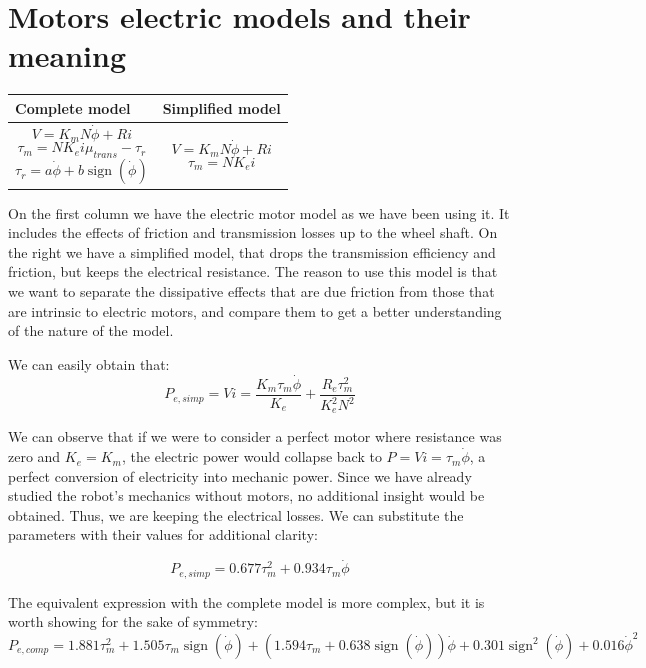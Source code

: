 \documentclass[12pt]{article}
\begin{document}
\section{Motors electric models and their meaning}

\begin{center}
	\begin{tabular}{ | m{12em} | m{10em}| } 
		\hline
		Complete model & Simplified model \\ 
		\hline
		$$ V = K_m N\dot{\phi} + Ri$$
		$$ \tau_m = N K_ei\mu_{trans} - \tau_r$$
		$$ \tau_r = a \dot{\phi} + b \operatorname{sign}(\dot{\phi}) $$ &
		$$ V = K_m N\dot{\phi} + Ri$$
		$$ \tau_m = N K_ei$$ \\ 
		\hline
	\end{tabular}
\end{center}
On the first column we have the electric motor model as we have been using it. It includes the effects of friction and transmission losses up to the wheel shaft. On the right we have a simplified model, that drops the transmission efficiency and friction, but keeps the electrical resistance. The reason to use this model is that we want to separate the dissipative effects that are due friction from those that are intrinsic to electric motors, and compare them to get a better understanding of the nature of the model.

We can easily obtain that:
$$P_{e, simp} = Vi = \frac{K_{m} \tau_{m} \dot{\phi}}{K_{e}} + \frac{R_{e} \tau_{m}^{2}}{K_{e}^{2} N^{2}}$$

We can observe that if we were to consider a perfect motor where resistance was zero and $K_e = K_m$, the electric power would collapse back to $P = Vi = \tau_{m} \dot{\phi}$, a perfect conversion of electricity into mechanic power. Since we have already studied the robot's mechanics without motors, no additional insight would be obtained. Thus, we are keeping the electrical losses. We can substitute the parameters with their values for additional clarity:

$$ P_{e, simp} = 0.677 \tau_{m}^{2} + 0.934 \tau_{m} \dot{\phi}$$

The equivalent expression with the complete model is more complex, but it is worth showing for the sake of symmetry:
$$ P_{e,comp} = 1.881 \tau_{m}^{2} + 1.505 \tau_{m} \operatorname{sign}\left(\dot{\phi}\right) + \left(1.594 \tau_{m} + 0.638 \operatorname{sign}\left(\dot{\phi}\right)\right) \dot{\phi} + 0.301 \operatorname{sign}^{2}\left(\dot{\phi}\right) + 0.016 \dot{\phi}^{2}$$
\end{document}
